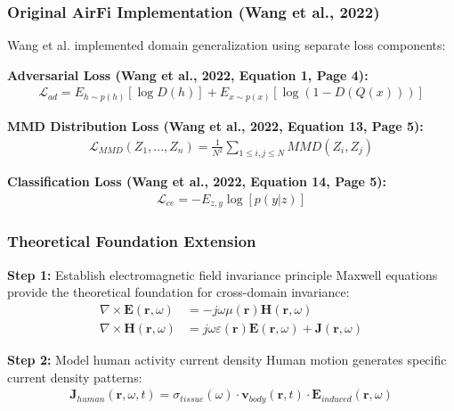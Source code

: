 \documentclass[12pt,a4paper]{article}
\begin{document}
\subsubsection{Original AirFi Implementation (Wang et al., 2022)}

Wang et al. \cite{wang2022airfi} implemented domain generalization using separate loss components:

\textbf{Adversarial Loss (Wang et al., 2022, Equation 1, Page 4):}
\begin{align}
\mathcal{L}_{ad} = E_{h \sim p(h)}[\log D(h)] + E_{x \sim p(x)}[\log(1-D(Q(x)))] \label{eq:airfi_adversarial}
\end{align}

\textbf{MMD Distribution Loss (Wang et al., 2022, Equation 13, Page 5):}
\begin{align}
\mathcal{L}_{MMD}(Z_1, ..., Z_n) = \frac{1}{N^2} \sum_{1 \leq i,j \leq N} MMD(Z_i, Z_j) \label{eq:airfi_mmd}
\end{align}

\textbf{Classification Loss (Wang et al., 2022, Equation 14, Page 5):}
\begin{align}
\mathcal{L}_{ce} = -E_{z,y} \log[p(y|z)] \label{eq:airfi_classification}
\end{align}

\subsubsection{Theoretical Foundation Extension}

\textbf{Step 1:} Establish electromagnetic field invariance principle
Maxwell equations provide the theoretical foundation for cross-domain invariance:
\begin{align}
\nabla \times \mathbf{E}(\mathbf{r},\omega) &= -j\omega\mu(\mathbf{r})\mathbf{H}(\mathbf{r},\omega) \label{eq:maxwell_frequency_domain}\\
\nabla \times \mathbf{H}(\mathbf{r},\omega) &= j\omega\varepsilon(\mathbf{r})\mathbf{E}(\mathbf{r},\omega) + \mathbf{J}(\mathbf{r},\omega) \label{eq:maxwell_ampere_frequency}
\end{align}

\textbf{Step 2:} Model human activity current density
Human motion generates specific current density patterns:
\begin{align}
\mathbf{J}_{human}(\mathbf{r},\omega,t) = \sigma_{tissue}(\omega) \cdot \mathbf{v}_{body}(\mathbf{r},t) \cdot \mathbf{E}_{induced}(\mathbf{r},\omega) \label{eq:human_current_density}
\end{align}
\end{document}
